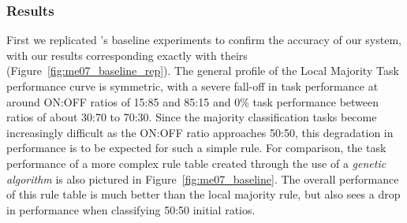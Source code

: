 \documentclass[a4paper,11pt]{article}
\begin{document}
\subsubsection*{Results}
First we replicated \citeauthor{me07}'s baseline experiments to confirm the accuracy of our system, with our results corresponding exactly with theirs (Figure~\ref{fig:me07_baseline_rep}). The general profile of the Local Majority Task performance curve is symmetric, with a severe fall-off in task performance at around ON:OFF ratios of 15:85 and 85:15 and 0\% task performance between ratios of about 30:70 to 70:30. Since the majority classification tasks become increasingly difficult as the ON:OFF ratio approaches 50:50, this degradation in performance is to be expected for such a simple rule. For comparison, the task performance of a more complex rule table created through the use of a \textit{genetic algorithm} is also pictured in Figure~\ref{fig:me07_baseline}. The overall performance of this rule table is much better than the local majority rule, but also sees a drop in performance when classifying 50:50 initial ratios.
\end{document}
